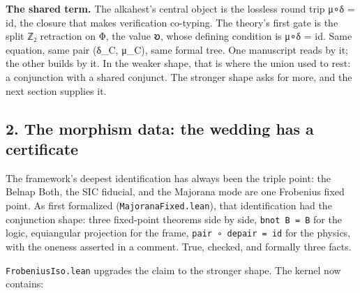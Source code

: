 \textbf{The shared term.} The alkahest's central object is the lossless
round trip μ∘δ = id, the closure that makes verification co-typing. The
theory's first gate is the split ℤ₂ retraction on Φ, the value 𐑹, whose
defining condition is μ∘δ = id. Same equation, same pair (δ\_C, μ\_C),
same formal tree. One manuscript reads by it; the other builds by it. In
the weaker shape, that is where the union used to rest: a conjunction
with a shared conjunct. The stronger shape asks for more, and the next
section supplies it.

\hypertarget{the-morphism-data-the-wedding-has-a-certificate}{%
\subsection{2. The morphism data: the wedding has a
certificate}\label{the-morphism-data-the-wedding-has-a-certificate}}

The framework's deepest identification has always been the triple point:
the Belnap Both, the SIC fiducial, and the Majorana mode are one
Frobenius fixed point. As first formalized
(\texttt{MajoranaFixed.lean}), that identification had the conjunction
shape: three fixed-point theorems side by side, \texttt{bnot\ B\ =\ B}
for the logic, equiangular projection for the frame,
\texttt{pair\ ∘\ depair\ =\ id} for the physics, with the oneness
asserted in a comment. True, checked, and formally three facts.

\texttt{FrobeniusIso.lean} upgrades the claim to the stronger shape. The
kernel now contains:

